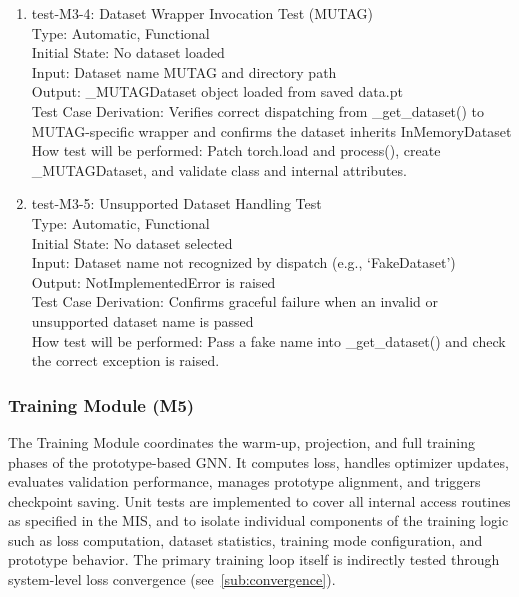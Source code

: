\documentclass[12pt, titlepage]{article}
\begin{document}
\begin{enumerate}
\item{test-M3-4: Dataset Wrapper Invocation Test (MUTAG)\\}
Type: Automatic, Functional \\
Initial State: No dataset loaded \\
Input: Dataset name MUTAG and directory path \\
Output: \_MUTAGDataset object loaded from saved data.pt \\
Test Case Derivation: Verifies correct dispatching from \_get\_dataset() to MUTAG-specific wrapper and confirms the dataset inherits InMemoryDataset \\
How test will be performed: Patch torch.load and process(), create \_MUTAGDataset, and validate class and internal attributes.

\item{test-M3-5: Unsupported Dataset Handling Test\\}
Type: Automatic, Functional \\
Initial State: No dataset selected \\
Input: Dataset name not recognized by dispatch (e.g., `FakeDataset') \\
Output: NotImplementedError is raised \\
Test Case Derivation: Confirms graceful failure when an invalid or unsupported dataset name is passed \\
How test will be performed: Pass a fake name into \_get\_dataset() and check the correct exception is raised.


\end{enumerate}


\subsubsection{Training Module (M5)}

The Training Module coordinates the warm-up, projection, and full training phases of the prototype-based GNN. It computes loss, handles optimizer updates, evaluates validation performance, manages prototype alignment, and triggers checkpoint saving. Unit tests are implemented to cover all internal access routines as specified in the MIS, and to isolate individual components of the training logic such as loss computation, dataset statistics, training mode configuration, and prototype behavior. The primary training loop itself is indirectly tested through system-level loss convergence (see~\ref{sub:convergence}).
\end{document}
